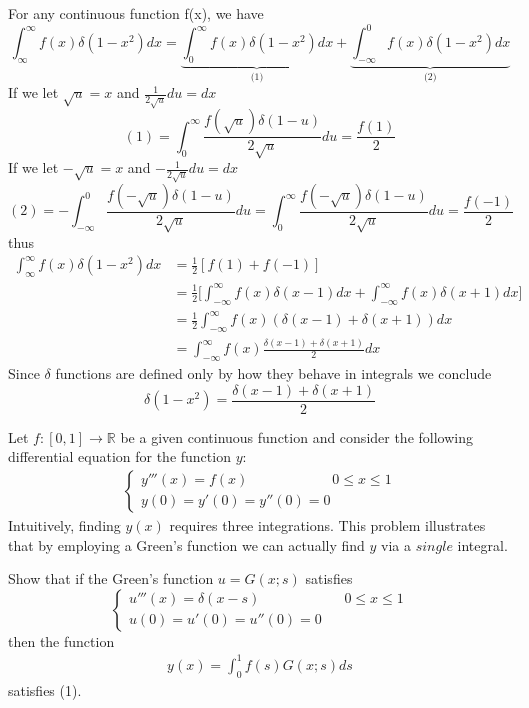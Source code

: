 \documentclass[12pt]{article}
\newcommand{\R}{\mathbb{R}}
\newenvironment{problem}[2][Problem]{\begin{trivlist}
  \item[\hskip \labelsep {\bfseries #1}\hskip \labelsep {\bfseries #2:}]}{\end{trivlist}}
\newenvironment{subproblem}[2][Part]{\begin{trivlist}
  \item[\hskip \labelsep {\bfseries #1}\hskip \labelsep {\bfseries (#2)}]}{\end{trivlist}}
\newenvironment{solution}[1][Solution]{\begin{trivlist}
  \item[\hskip \labelsep {\bfseries #1} \hskip \labelsep]}{\end{trivlist}}
\theoremstyle{remark}
\begin{document}
\begin{solution}
  For any continuous function f(x), we have
  \[
    \int_{\infty}^{\infty}f(x)\delta(1-x^2)dx =
    \underbrace{\int_{0}^{\infty}f(x)\delta(1-x^2)dx}_\text{(1)} +
    \underbrace{\int_{-\infty}^{0}f(x)\delta(1-x^2)dx}_\text{(2)}
  \]
  If we let \(\sqrt{u} = x\) and \(\frac{1}{2\sqrt{u}}du = dx\)
  \[
    (1) = \int_{0}^{\infty}\frac{f(\sqrt{u})\delta(1-u)}{2\sqrt{u}}du = \frac{f(1)}{2}
  \]
  If we let \(-\sqrt{u} = x\) and \(-\frac{1}{2\sqrt{u}}du = dx\)
  \[
    (2) = -\int_{-\infty}^{0}\frac{f(-\sqrt{u})\delta(1-u)}{2\sqrt{u}}du
    = \int_{0}^{\infty}\frac{f(-\sqrt{u})\delta(1-u)}{2\sqrt{u}}du
    = \frac{f(-1)}{2}
  \]
  thus
  \begin{align*}
    \int_{\infty}^{\infty}f(x)\delta(1-x^2)dx
    &= \frac{1}{2}[f(1) + f(-1)] \\
    &= \frac{1}{2}\bigg[\int_{-\infty}^{\infty}f(x)\delta(x-1)dx +
      \int_{-\infty}^{\infty}f(x)\delta(x+1)dx\bigg] \\
    &= \frac{1}{2}\int_{-\infty}^{\infty}f(x)(\delta(x-1) + \delta(x+1)) dx \\
    &= \int_{-\infty}^{\infty}f(x)\frac{\delta(x-1) + \delta(x+1)}{2} dx
  \end{align*}
  Since \(\delta\) functions are defined only by how they behave in integrals we conclude
  \[
    \boxed{\delta(1-x^2) = \frac{\delta(x-1)+\delta(x+1)}{2}}
  \]
\end{solution}
\clearpage
\begin{problem}{3}
  Let \(f : [0,1] \rightarrow \R\) be a given continuous function
  and consider the following differential equation for the function \(y\):
  \begin{align}
    \left\{
    \begin{array}{ll}
      y'''(x) = f(x) \qquad\qquad\qquad 0 \le x \le 1 \\
      y(0) = y'(0) = y''(0) = 0
    \end{array}
    \right.
  \end{align}
  Intuitively, finding \(y(x)\) requires three integrations. This problem illustrates that
  by employing a Green's function we can actually find \(y\) via a $single$ integral.
\end{problem}
\begin{subproblem}{a}
  Show that if the Green's function \(u = G(x;s)\) satisfies
  \[
    \left\{
      \begin{array}{ll}
        u'''(x) = \delta(x-s) \qquad\qquad\qquad 0 \le x \le 1 \\
        u(0) = u'(0) = u''(0) = 0
      \end{array}
    \right.
  \]
  then the function
  \begin{align}
    y(x) = \int_{0}^{1}f(s)G(x;s)ds
  \end{align}
  satisfies (1).
\end{subproblem}
\end{document}
